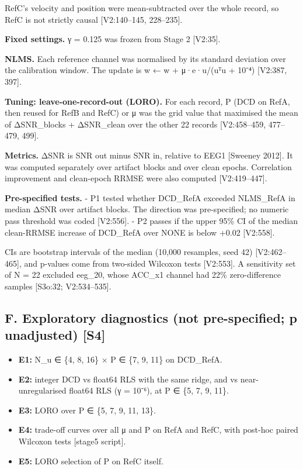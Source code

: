 \documentclass[
  9pt,
]{article}
\providecommand{\tightlist}{%
  \setlength{\itemsep}{0pt}\setlength{\parskip}{0pt}}
\begin{document}
RefC's velocity and position were mean-subtracted over the whole record,
so RefC is not strictly causal {[}V2:140--145, 228--235{]}.

\textbf{Fixed settings.} γ = 0.125 was frozen from Stage 2 {[}V2:35{]}.

\textbf{NLMS.} Each reference channel was normalised by its standard
deviation over the calibration window. The update is w ← w + μ·e·u/(uᵀu
+ 10⁻⁴) {[}V2:387, 397{]}.

\textbf{Tuning: leave-one-record-out (LORO).} For each record, P (DCD on
RefA, then reused for RefB and RefC) or μ was the grid value that
maximised the mean of ΔSNR\_blocks + ΔSNR\_clean over the other 22
records {[}V2:458--459, 477--479, 499{]}.

\textbf{Metrics.} ΔSNR is SNR out minus SNR in, relative to EEG1
{[}Sweeney 2012{]}. It was computed separately over artifact blocks and
over clean epochs. Correlation improvement and clean-epoch RRMSE were
also computed {[}V2:419--447{]}.

\textbf{Pre-specified tests.} - P1 tested whether DCD\_RefA exceeded
NLMS\_RefA in median ΔSNR over artifact blocks. The direction was
pre-specified; no numeric pass threshold was coded {[}V2:556{]}. - P2
passes if the upper 95\% CI of the median clean-RRMSE increase of
DCD\_RefA over NONE is below +0.02 {[}V2:558{]}.

CIs are bootstrap intervals of the median (10,000 resamples, seed 42)
{[}V2:462--465{]}, and p-values come from two-sided Wilcoxon tests
{[}V2:553{]}. A sensitivity set of N = 22 excluded eeg\_20, whose
ACC\_x1 channel had 22\% zero-difference samples {[}S3o:32;
V2:534--535{]}.

\hypertarget{f.-exploratory-diagnostics-not-pre-specified-p-unadjusted-s4}{%
\subsection{F. Exploratory diagnostics (not pre-specified; p unadjusted)
{[}S4{]}}\label{f.-exploratory-diagnostics-not-pre-specified-p-unadjusted-s4}}

\begin{itemize}
\tightlist
\item
  \textbf{E1:} N\_u ∈ \{4, 8, 16\} × P ∈ \{7, 9, 11\} on DCD\_RefA.
\item
  \textbf{E2:} integer DCD vs float64 RLS with the same ridge, and vs
  near-unregularised float64 RLS (γ = 10⁻⁶), at P ∈ \{5, 7, 9, 11\}.
\item
  \textbf{E3:} LORO over P ∈ \{5, 7, 9, 11, 13\}.
\item
  \textbf{E4:} trade-off curves over all μ and P on RefA and RefC, with
  post-hoc paired Wilcoxon tests {[}stage5 script{]}.
\item
  \textbf{E5:} LORO selection of P on RefC itself.
\end{itemize}
\end{document}
